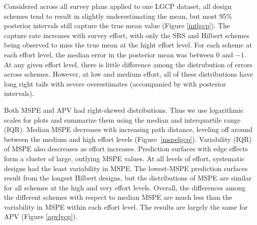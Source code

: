 \documentclass[review]{elsarticle}
\begin{document}
Considered across all survey plans applied to one LGCP dataset, all design
schemes tend to result in slightly underestimating the mean, but most
95\% posterior intervals still capture the true mean value (Figure
\ref{intlgcp}). The capture rate increases with survey effort, with only
the SRS and Hilbert schemes being observed to miss the true mean at the
hight effort level. For each scheme at each effort level, the median
error in the posterior mean was between 0 and \(-1\). At any given effort
level, there is little difference among the distrubution of errors across
schemes. However, at low and medium effort, all of these distributions
have long right tails with severe overestimates (accompanied by with
posterior intervals).

Both MSPE and APV had right-skewed distributions. Thus we use logarithmic
scales for plots and summarize them using the median and interquartile range
(IQR). Median MSPE decreases with increasing path distance, leveling off
around between the medium and high effort levels (Figure~\ref{mspelgcp}).
Variability (IQR) of MSPE also descreases as effort increases. Prediction
surfaces with edge effects form a cluster of large, outlying MSPE values. At
all levels of effort, systematic designs had the least variability in MSPE.
The lowest-MSPE prediction surfaces result from the longest Hilbert designs,
but the distributions of MSPE are similar for all schemes at the high and very
effort levels. Overall, the differences among the different schemes with
respect to median MSPE are much less than the variability in MSPE within each
effort level. The results are largely the same for APV (Figure \ref{apvlgcp}).



\end{document}
